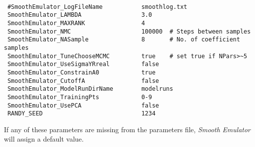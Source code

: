 \documentclass[UserManual.tex]{subfiles}
\begin{document}
{\tt
\begin{verbatim}
 #SmoothEmulator_LogFileName           smoothlog.txt
 SmoothEmulator_LAMBDA                 3.0
 SmoothEmulator_MAXRANK                4
 SmoothEmulator_NMC                    100000  # Steps between samples 
 SmoothEmulator_NASample               8       # No. of coefficient samples
 SmoothEmulator_TuneChooseMCMC         true    # set true if NPars>~5
 SmoothEmulator_UseSigmaYRreal         false 
 SmoothEmulator_ConstrainA0            true
 SmoothEmulator_CutoffA                false
 SmoothEmulator_ModelRunDirName        modelruns
 SmoothEmulator_TrainingPts            0-9
 SmoothEmulator_UsePCA                 false
 RANDY_SEED                            1234
\end{verbatim}
}
If any of these parameters are missing from the parameters file, {\it Smooth Emulator} will assign a default value.
\end{document}
